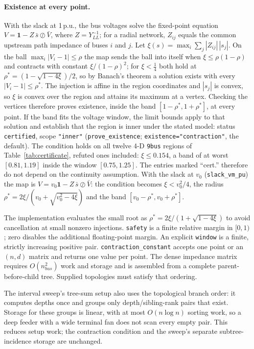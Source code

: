 \documentclass[11pt,a4paper]{report}
\newcommand{\code}[1]{\texttt{\small #1}}
\begin{document}
\paragraph{Existence at every point.} With the slack at 1\,p.u., the bus
voltages solve the fixed-point equation
$V = \mathbf 1 - Z\,\bar s \oslash \bar V$, where $Z = Y_{LL}^{-1}$; for a
radial network, $Z_{ij}$ equals the common upstream path impedance of buses
$i$ and $j$. Let $\xi(s) = \max_i \sum_j |Z_{ij}|\,|s_j|$. On the ball
$\max_i|V_i-1|\le\rho$ the map sends the ball into itself when
$\xi \le \rho(1-\rho)$ and contracts with constant $\xi/(1-\rho)^2$; for
$\xi<\frac14$ both hold at $\rho^\ast = (1-\sqrt{1-4\xi})/2$, so by Banach's
theorem a solution exists with every $|V_i-1|\le\rho^\ast$. The injection is
affine in the region coordinates and $|s_j|$ is convex, so $\xi$ is convex over
the region and attains its maximum at a vertex. Checking the vertices
therefore proves existence, inside the band $[1-\rho^\ast, 1+\rho^\ast]$, at every
point. If the band fits the voltage window, the limit bounds apply to that
solution and establish that the region is inner under the stated model: status \code{certified},
scope \code{"inner"} (\code{prove\_existence}; \code{existence="contraction"},
the default). The condition holds on all twelve 4-D \code{9bus} regions of
Table~\ref{tab:certificate}, refuted ones included: $\xi \le 0.154$, a band of
at worst $[0.81, 1.19]$ inside the window $[0.75, 1.25]$. The entries marked
``cert.'' therefore do not depend on the continuity assumption. With the slack at
$v_0$ (\code{slack\_vm\_pu}) the map is $V = v_0\mathbf 1 - Z\,\bar s \oslash \bar V$:
the condition becomes $\xi < v_0^2/4$, the radius
$\rho^\ast = 2\xi/(v_0+\sqrt{v_0^2-4\xi})$ and the band
$[v_0-\rho^\ast, v_0+\rho^\ast]$.

The implementation evaluates the small root as
$\rho^\ast=2\xi/(1+\sqrt{1-4\xi})$ to avoid cancellation at small nonzero
injections. \code{safety} is a finite relative margin in $[0,1)$; zero disables
the additional floating-point margin. An explicit \code{window} is a finite,
strictly increasing positive pair. \code{contraction\_constant} accepts one
point or an $(n,d)$ matrix and returns one value per point. The dense impedance
matrix requires $O(n_{bus}^2)$ work and storage and is assembled from a complete
parent-before-child tree. Supplied topologies must satisfy that ordering.

The interval sweep's tree-sum setup also uses the topological branch order:
it computes depths once and groups only depth/sibling-rank pairs that exist.
Storage for these groups is linear, with at most $O(n\log n)$ sorting work,
so a deep feeder with a wide terminal fan does not scan every empty pair.
This reduces setup work; the contraction condition and the sweep's separate
subtree-incidence storage are unchanged.
\end{document}
